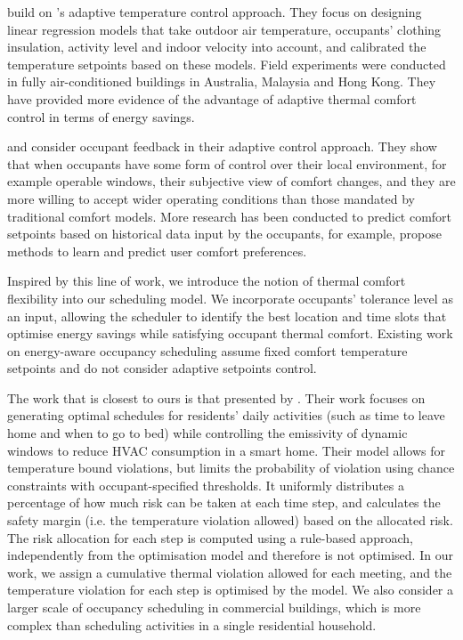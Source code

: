 \cite{egan2010the,chew2015adaptive,mui2003adaptive} build on \cite{de1998developing}'s adaptive temperature control approach. They focus on designing linear regression models that take outdoor air temperature, occupants' clothing insulation, activity level and indoor velocity into account, and calibrated the temperature setpoints based on these models. Field experiments were conducted in fully air-conditioned buildings in Australia, Malaysia and Hong Kong. They have provided more evidence of the advantage of adaptive thermal comfort control in terms of energy savings. 

\cite{ward2010automate} and \cite{west2014trial} consider occupant feedback in their adaptive control approach. They show that when occupants have some form of control over their local environment, for example operable windows, their subjective view of comfort changes, and they are more willing to accept wider operating conditions than those mandated by traditional comfort models. More research has been conducted to predict comfort setpoints based on historical data input by the occupants, for example, \cite{schumann2010learning} propose methods to learn and predict user comfort preferences.

Inspired by this line of work, we introduce the notion of thermal comfort flexibility into our scheduling model. We incorporate occupants' tolerance level as an input, allowing the scheduler to identify the best location and time slots that optimise energy savings while satisfying occupant thermal comfort. Existing work on energy-aware occupancy scheduling \citep{chai2014minimizing,lim2015hvac,lim2015large,majumdar2016characterising,majumdar2012energy,pan2013minimizing,pan2012thermal} assume fixed comfort temperature setpoints and do not consider adaptive setpoints control. 

The work that is closest to ours is that presented by \cite{ono2012risk}. Their work focuses on generating optimal schedules for residents' daily activities (such as time to leave home and when to go to bed) while controlling the emissivity of dynamic windows to reduce HVAC consumption in a smart home. Their model allows for temperature bound violations, but limits the probability of violation using chance constraints with occupant-specified thresholds. It uniformly distributes a percentage of how much risk can be taken at each time step, and calculates the safety margin (i.e. the temperature violation allowed) based on the allocated risk. The risk allocation for each step is computed using a rule-based approach, independently from the optimisation model and therefore is not optimised. In our work, we assign a cumulative thermal violation allowed for each meeting, and the temperature violation for each step is optimised by the model. We also consider a larger scale of occupancy scheduling in commercial buildings, which is more complex than scheduling activities in a single residential household.

